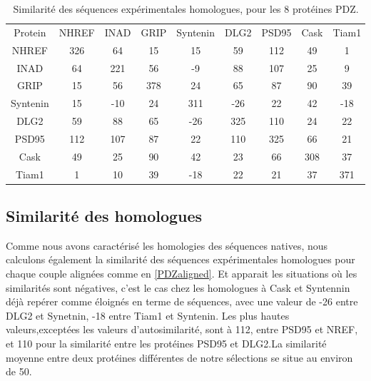     \begin{table}[!htbp]
      \centering

      \begin{tabular}{ccccccccc}

        \toprule
        Protein & NHREF        & INAD      & GRIP        & Syntenin        & DLG2       & PSD95       & Cask       & Tiam1 \\
        \cmidrule{1-9}

        NHREF    & 326 &  64 &  15 &  15 &  59 & 112 & 49  &   1  \\     
        INAD    &  64 & 221 &  56 &  -9 &  88 & 107 & 25  &   9  \\
        GRIP    &  15 &  56 & 378 &  24 &  65 &  87 & 90  &  39  \\
        Syntenin    &  15 & -10 &  24 & 311 & -26 &  22 & 42  & -18  \\
        DLG2    &  59 &  88 &  65 & -26 & 325 & 110 & 24  &  22  \\
        PSD95    & 112 & 107 &  87 &  22 & 110 & 325 & 66  &  21  \\
        Cask    &  49 &  25 &  90 &  42 &  23 &  66 & 308 & 37   \\
        Tiam1   &  1  &  10 &  39 & -18 &  22 &  21 & 37  & 371 \\
        \bottomrule


      \end{tabular} 
      \caption{Similarité des séquences expérimentales homologues, pour les 8 protéines PDZ.}
\label{tab:XSIMIL}      
    \end{table}

    \subsection{Similarité des homologues}

Comme nous avons caractérisé les homologies des séquences natives, nous calculons également la similarité des séquences expérimentales homologues pour chaque couple alignées comme en \ref{PDZaligned}. Et apparait les situations où les similarités sont négatives, c'est le cas chez les homologues à Cask et Syntennin déjà repérer comme éloignés en terme de séquences, avec une valeur de -26 entre DLG2 et Synetnin, -18 entre Tiam1  et Syntenin. Les plus hautes valeurs,exceptées les valeurs d'autosimilarité, sont à  112, entre PSD95 et NREF, et 110 pour la similarité entre les protéines PSD95 et DLG2.La similarité moyenne entre deux protéines différentes de notre sélections se situe au environ de 50. 

